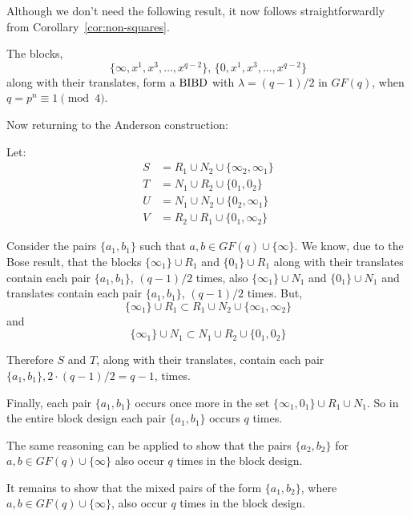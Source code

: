 Although we don’t need the following result, it now follows straightforwardly from Corollary~\ref{cor:non-squares}.

\begin{corollary}
The blocks,
\begin{equation}
\{\infty, x^1, x^3, \ldots, x^{q - 2}\},\, \{0, x^1, x^3, \ldots, x^{q - 2}\}
\end{equation}
along with their translates, form a $\operatorname{BIBD}$ with
$\lambda = (q - 1)/2$ in $GF(q)$, when
$q = p^n \equiv 1\pmod 4$.
\end{corollary}

Now returning to the Anderson construction:

Let:
\begin{align}
  S &= R_1 \cup N_2 \cup \{\infty _2, \infty _1\} \\
  T &= N_1 \cup R_2 \cup \{0_1, 0_2\} \\
  U &= N_1 \cup N_2 \cup \{0 _2, \infty _1\} \\
  V &= R_2 \cup R_1 \cup \{0_1, \infty _2\}
\end{align}

Consider the pairs $\{a_1, b_1\}$ such that $a, b \in GF(q) \cup \{\infty\}$.
We know, due to the Bose result, that the blocks $\{\infty _1\} \cup R_1$ and $\{0 _1\} \cup R_1$ along with their translates contain each pair $\{a_1, b_1\}$, $(q - 1)/2$ times, also $\{\infty _1\} \cup N_1$ and $\{0 _1\} \cup N_1$ and translates contain each pair $\{a_1, b_1\}$, $(q - 1)/2$ times.
But,
\begin{equation}
\{\infty _1\} \cup R_1 \subset R_1 \cup N_2 \cup \{\infty _1, \infty _2\}
\end{equation}
and
\begin{equation}
\{\infty _1\} \cup N_1 \subset N_1 \cup R_2 \cup \{0_1, 0_2\}
\end{equation}

Therefore $S$ and $T$, along with their translates, contain each pair $\{a_1, b_1\}, 2\cdot (q - 1)/2 = q - 1$, times.

Finally, each pair $\{a_1, b_1\}$ occurs once more in the set $\{\infty _1, 0_1\} \cup R_1 \cup N_1$.
So in the entire block design each pair $\{a_1, b_1\}$ occurs $q$ times.

The same reasoning can be applied to show that the pairs $\{a_2,b_2\}$ for $a,b \in GF(q) \cup \{\infty\}$ also occur $q$ times in the block design.

It remains to show that the mixed pairs of the form $\{a_1, b_2\}$, where $a, b \in GF(q) \cup \{\infty\}$, also occur $q$ times in the block design.


